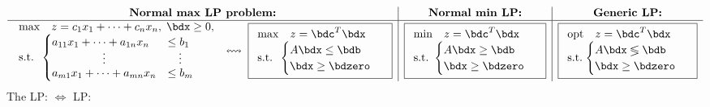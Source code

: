 \documentclass[a4paper]{article}
\begin{document}
\[
  \begin{array}[m]{c|c|c}
    \textbf{Normal max LP problem:}
    & \textbf{Normal min LP:}
    & \textbf{Generic LP:}
  \\ \hline
    \begin{array}[m]{ll}
      \max & z = c_1x_1+\cdots+c_nx_n, \;\bdx\ge0, \cr
      \mbox{s.t.} &
      \mkern-15mu
      \begin{cases}
        a_{11}x_1+\cdots+a_{1n}x_n &\le b_1 \\[-3pt]
        \hfil\vdots &  \hfil\vdots          \\[-3pt]
        a_{m1}x_1+\cdots+a_{mn}x_n &\le b_m \cr
      \end{cases}
    \end{array}
  \;\leftrightsquigarrow\;
  \boxed{
    \begin{array}[m]{ll}
      \max & z=\bdc^T\bdx\cr
      \mbox{s.t.} &
      \mkern-15mu
      \begin{cases}
      A\bdx\le\bdb\cr
      \hfill\bdx\ge\bdzero
      \end{cases}
    \end{array}
  } %
  &
  \boxed{
    \begin{array}[m]{ll}
      \min & z=\bdc^T\bdx\cr
      \mbox{s.t.} &
      \mkern-15mu
      \begin{cases}
      A\bdx\ge\bdb\cr
      \hfill\bdx\ge\bdzero
      \end{cases}
    \end{array}
  } %
  &
  \boxed{
    \begin{array}[m]{ll}
      \text{opt} & z=\bdc^T\bdx\cr
      \mbox{s.t.} &
      \mkern-15mu
      \begin{cases}
      A\bdx\lessgtr\bdb\cr
      \hfill\bdx\ge\bdzero
      \end{cases}
    \end{array}
  } %
  \end{array}
\]
The LP: 
  $\iff$
  LP: 
\end{document}
